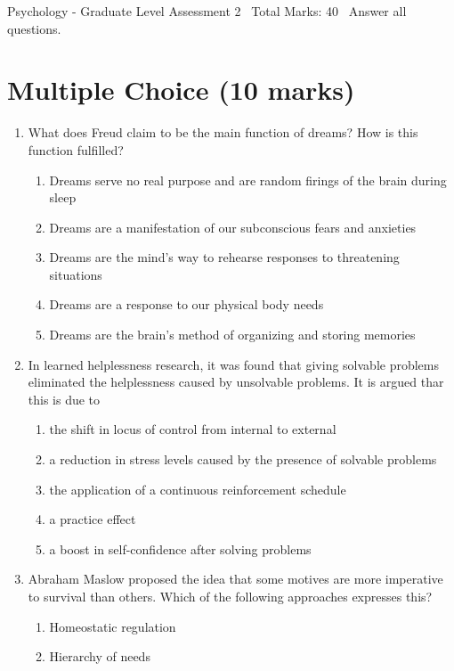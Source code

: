\documentclass[12pt]{article}
\begin{document}
\begin{center}
Psychology - Graduate Level Assessment 2 \
Total Marks: 40 \
Answer all questions.
\end{center}

\section*{Multiple Choice (10 marks)}
\begin{enumerate}[label=\arabic*.]
\item What does Freud claim to be the main function of dreams? How is this function fulfilled?
\begin{enumerate}[label=(\alph*)]
    \item Dreams serve no real purpose and are random firings of the brain during sleep
    \item Dreams are a manifestation of our subconscious fears and anxieties
    \item Dreams are the mind's way to rehearse responses to threatening situations
    \item Dreams are a response to our physical body needs
    \item Dreams are the brain's method of organizing and storing memories
\end{enumerate}
\item In learned helplessness research, it was found that giving solvable problems eliminated
the helplessness caused by unsolvable problems. It is argued thar this is due to
\begin{enumerate}[label=(\alph*)]
    \item the shift in locus of control from internal to external
    \item a reduction in stress levels caused by the presence of solvable problems
    \item the application of a continuous reinforcement schedule
    \item a practice effect
    \item a boost in self-confidence after solving problems
\end{enumerate}
\item Abraham Maslow proposed the idea that some motives are more imperative to survival than
others. Which of the following approaches expresses this?
\begin{enumerate}[label=(\alph*)]
    \item Homeostatic regulation
    \item Hierarchy of needs

\end{enumerate}
\end{enumerate}
\end{document}
